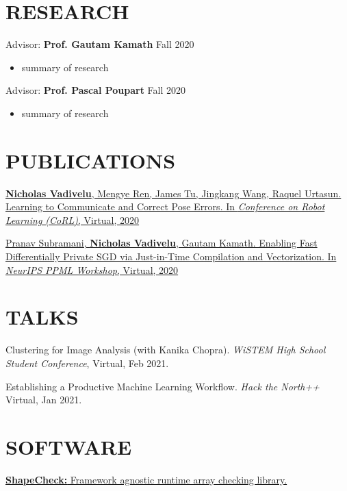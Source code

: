 \documentclass[line,margin]{res}
\begin{document}
\begin{resume}
\section{RESEARCH}
    Advisor: \textbf{Prof. Gautam Kamath} \hfill Fall 2020\\
        \vspace{-4mm}
        \begin{itemize}  \itemsep -2pt %
        \item summary of research
        \end{itemize}

    \vspace{-1mm}
    Advisor: \textbf{Prof. Pascal Poupart} \hfill Fall 2020\\
        \vspace{-4mm}
        \begin{itemize}  \itemsep -2pt %
        \item summary of research
        \end{itemize}

\section{PUBLICATIONS}
    \href{https://arxiv.org/abs/2011.05289}
    {\textbf{Nicholas Vadivelu}, Mengye Ren, James Tu, Jingkang Wang, Raquel Urtasun.
    Learning to Communicate and Correct Pose Errors.
    In \textit{Conference on Robot Learning (CoRL)},
    Virtual, 2020}
    \vspace{-2mm}

    \href{https://arxiv.org/abs/2010.09063}
    {Pranav Subramani, \textbf{Nicholas Vadivelu}, Gautam Kamath.
    Enabling Fast Differentially Private SGD via Just-in-Time Compilation and Vectorization.
    In \textit{NeurIPS PPML Workshop},
    Virtual, 2020}

\section{TALKS}
    Clustering for Image Analysis (with Kanika Chopra).
    \textit{WiSTEM High School Student Conference},
    Virtual, Feb 2021.
    \vspace{-2mm}

    Establishing a Productive Machine Learning Workflow.
    \textit{Hack the North++}
    Virtual, Jan 2021.

\section{SOFTWARE}
    \href{https://github.com/n2cholas/jax-resnet}
    {\textbf{ShapeCheck: } Framework agnostic runtime array checking library.
    \vspace{-2mm}}


\end{resume}
\end{document}
